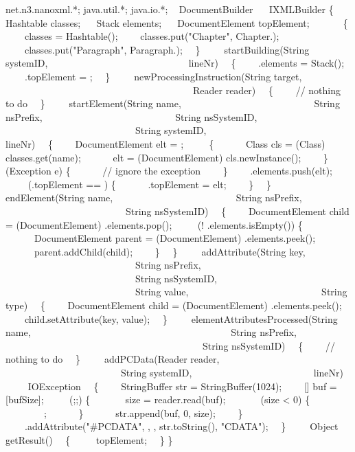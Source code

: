 \begin{example}
 net.n3.nanoxml.*;
 java.util.*;
 java.io.*;
~
 DocumentBuilder
~~ IXMLBuilder
\{
~~ Hashtable classes;
~~ Stack elements;
~~ DocumentElement topElement;
~
~~
~~\{
~~~~classes =  Hashtable();
~~~~classes.put("Chapter", Chapter.);
~~~~classes.put("Paragraph", Paragraph.);
~~\}
~
~~ startBuilding(String systemID,
~~~~~~~~~~~~~~~~~~~~~~~~~~~~ lineNr)
~~\{
~~~~.elements =  Stack();
~~~~.topElement = ;
~~\}
~
~~ newProcessingInstruction(String target,
~~~~~~~~~~~~~~~~~~~~~~~~~~~~~~~~~~~~~~~Reader reader)
~~\{
~~~~// nothing to do
~~\}
~
~~ startElement(String name,
~~~~~~~~~~~~~~~~~~~~~~~~~~~String nsPrefix,
~~~~~~~~~~~~~~~~~~~~~~~~~~~String nsSystemID,
~~~~~~~~~~~~~~~~~~~~~~~~~~~String systemID,
~~~~~~~~~~~~~~~~~~~~~~~~~~~ lineNr)
~~\{
~~~~DocumentElement elt = ;
~~~~ \{
~~~~~~Class cls = (Class) classes.get(name);
~~~~~~elt = (DocumentElement) cls.newInstance();
~~~~\}  (Exception e) \{
~~~~~~// ignore the exception
~~~~\}
~~~~.elements.push(elt);
~~~~ (.topElement == ) \{
~~~~~~.topElement = elt;
~~~~\}
~~\}
~
~~ endElement(String name,
~~~~~~~~~~~~~~~~~~~~~~~~~String nsPrefix,
~~~~~~~~~~~~~~~~~~~~~~~~~String nsSystemID)
~~\{
~~~~DocumentElement child = (DocumentElement) .elements.pop();
~~~~ (! .elements.isEmpty()) \{
~~~~~~DocumentElement parent = (DocumentElement) .elements.peek();
~~~~~~parent.addChild(child);
~~~~\}
~~\}
~
~~ addAttribute(String key,
~~~~~~~~~~~~~~~~~~~~~~~~~~~String nsPrefix,
~~~~~~~~~~~~~~~~~~~~~~~~~~~String nsSystemID,
~~~~~~~~~~~~~~~~~~~~~~~~~~~String value,
~~~~~~~~~~~~~~~~~~~~~~~~~~~String type)
~~\{
~~~~DocumentElement child = (DocumentElement) .elements.peek();
~~~~child.setAttribute(key, value);
~~\}
~
~~ elementAttributesProcessed(String name,
~~~~~~~~~~~~~~~~~~~~~~~~~~~~~~~~~~~~~~~~~String nsPrefix,
~~~~~~~~~~~~~~~~~~~~~~~~~~~~~~~~~~~~~~~~~String nsSystemID)
~~\{
~~~~// nothing to do
~~\}
~
~~ addPCData(Reader reader,
~~~~~~~~~~~~~~~~~~~~~~~~String systemID,
~~~~~~~~~~~~~~~~~~~~~~~~ lineNr)
~~~~ IOException
~~\{
~~~~StringBuffer str =  StringBuffer(1024);
~~~~[] buf = [bufSize];
~~~~ (;;) \{
~~~~~~ size = reader.read(buf);
~~~~~~ (size < 0) \{
~~~~~~~~;
~~~~~~\}
~~~~~~str.append(buf, 0, size);
~~~~\}
~~~~.addAttribute("\#PCDATA", , , str.toString(), "CDATA");
~~\}
~
~~ Object getResult()
~~\{
~~~~ topElement;
~~\}
\}
\end{example}

